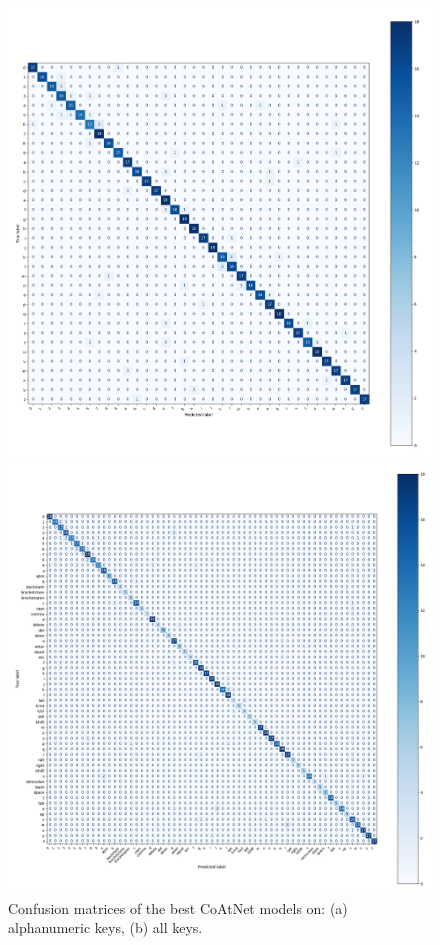 \documentclass[a4paper,11pt,twoside]{report}
\theoremstyle{definition}
\begin{document}
\begin{figure}[h!]
  \centering
  \begin{minipage}{0.49\linewidth}
      \centering
      \includegraphics[width=\linewidth]{img_results/cm_all_coatnet_alphanum.png}
      \subcaption{}
  \end{minipage}
  \hfill
  \begin{minipage}{0.49\linewidth}
      \centering
      \includegraphics[width=\linewidth]{img_results/cm_all_coatnet_all.png}
      \subcaption{}
  \end{minipage}
  \caption{Confusion matrices of the best CoAtNet models on: (a) alphanumeric keys, (b) all keys.}
  \label{fig:confusion_matrices}
\end{figure}
\end{document}
